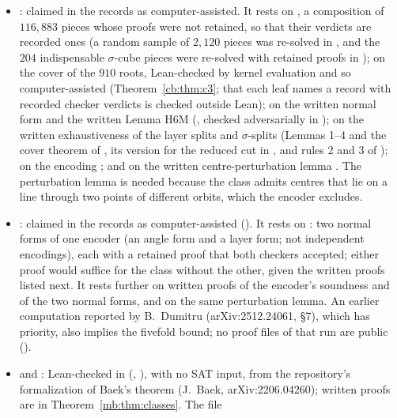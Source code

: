 \begin{remark}
\begin{itemize}
  ( \S6), by kernel evaluation, and so computer-assisted (Theorem~\ref{cb:thm:c2}; that the
  listed subcases are refuted rests on the records). A table of the evidence is in  \S1.
\item {}: claimed in the records as computer-assisted. It rests on , a composition of
  $116{,}883$ pieces whose proofs were not retained, so that their verdicts are recorded ones (a random sample of
  $2{,}120$ pieces was
  re-solved in , and the $204$ indispensable $\sigma$-cube pieces were re-solved with retained proofs in
  ); on the cover of the $910$ roots, Lean-checked by kernel evaluation and so computer-assisted
  (Theorem~\ref{cb:thm:c3}; that each leaf names a record with recorded checker verdicts is checked outside Lean); on
  the written normal form  and the written Lemma H6M (, checked
  adversarially in ); on the written exhaustiveness of the layer splits and $\sigma$-splits (Lemmas 1--4
  and the cover theorem of , its version for the reduced cut in
  , and rules 2 and 3 of ); on the encoding ; and on
  the written centre-perturbation lemma . The perturbation lemma is needed because the
  class admits centres that lie on a line through two points of different orbits, which the encoder excludes.
\item {}: claimed in the records as computer-assisted (). It rests on :
  two normal forms of one encoder (an angle form and a layer form; not independent encodings), each with a retained
  proof that both checkers accepted; either proof would suffice for the class without the other, given the written
  proofs listed next. It rests further on written proofs of the encoder's soundness and of the two normal forms, and on
  the same perturbation lemma. An earlier computation reported by B.~Dumitru (arXiv:2512.24061, \S7), which has
  priority, also implies the fivefold bound; no proof files of that run are public ().
\item {} and : Lean-checked in 
  (, ), with no SAT input, from the repository's formalization
  of Baek's theorem (J.~Baek, arXiv:2206.04260); written proofs are in Theorem~\ref{mb:thm:classes}. The file

\end{itemize}
\end{remark}
